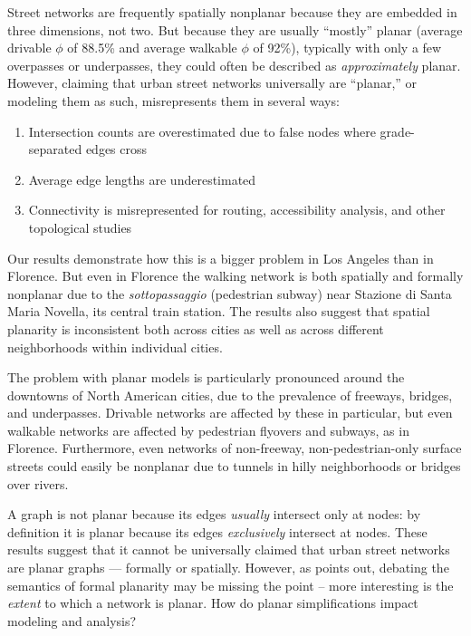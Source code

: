 \documentclass[Afour,sageh,times]{sagej}
\begin{document}
Street networks are frequently spatially nonplanar because they are embedded in three dimensions, not two. But because they are usually \enquote{mostly} planar (average drivable $\phi$ of 88.5\% and average walkable $\phi$ of 92\%), typically with only a few overpasses or underpasses, they could often be described as \emph{approximately} planar. However, claiming that urban street networks universally are \enquote{planar,} or modeling them as such, misrepresents them in several ways:

\begin{enumerate}
	\item{Intersection counts are overestimated due to false nodes where grade-separated edges cross}
	\item{Average edge lengths are underestimated}
	\item{Connectivity is misrepresented for routing, accessibility analysis, and other topological studies}
\end{enumerate}

Our results demonstrate how this is a bigger problem in Los Angeles than in Florence. But even in Florence the walking network is both spatially and formally nonplanar due to the \textit{sottopassaggio} (pedestrian subway) near Stazione di Santa Maria Novella, its central train station. The results also suggest that spatial planarity is inconsistent both across cities as well as across different neighborhoods within individual cities.

The problem with planar models is particularly pronounced around the downtowns of North American cities, due to the prevalence of freeways, bridges, and underpasses. Drivable networks are affected by these in particular, but even walkable networks are affected by pedestrian flyovers and subways, as in Florence. Furthermore, even networks of non-freeway, non-pedestrian-only surface streets could easily be nonplanar due to tunnels in hilly neighborhoods or bridges over rivers.

A graph is not planar because its edges \emph{usually} intersect only at nodes: by definition it is planar because its edges \emph{exclusively} intersect at nodes. These results suggest that it cannot be universally claimed that urban street networks are planar graphs --- formally or spatially. However, as \citet{newman_networks:_2010} points out, debating the semantics of formal planarity may be missing the point -- more interesting is the \emph{extent} to which a network is planar. How do planar simplifications impact modeling and analysis?
\end{document}
